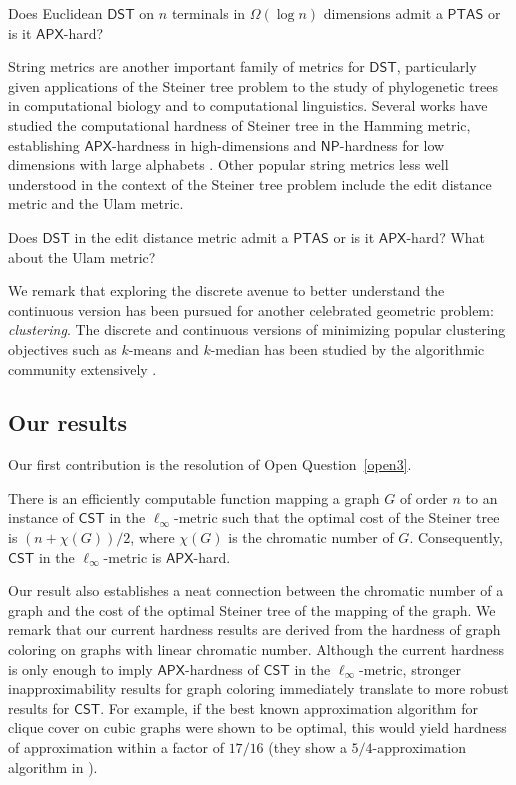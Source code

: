 \documentclass{theoretics}
\newcommand{\1}{\textbf{1}}
\newcommand{\cst}{$\mathsf{CST}$\xspace}
\newcommand{\dst}{$\mathsf{DST}$\xspace}
\newcommand{\np}{$\mathsf{NP}$\xspace}
\newcommand{\apx}{$\mathsf{APX}$\xspace}
\newcommand{\ptas}{$\mathsf{PTAS}$\xspace}
\begin{document}
\begin{openq}\label{open4}
Does Euclidean \dst on $n$ terminals in $\Omega(\log n)$ dimensions admit a \ptas or is it \apx-hard?\end{openq}

String metrics are another important family of metrics for \dst, particularly given applications of the Steiner tree problem to the study of phylogenetic trees in computational biology and to computational linguistics. Several works have studied the computational hardness of Steiner tree in the Hamming metric, establishing \apx-hardness in high-dimensions and \np-hardness for low dimensions with large alphabets \cite{Wareham_1995, althaus2013low, sankoff1975minimal, foulds1982steiner, fernandez1998approximability}.  Other popular string metrics less well understood in the context of the Steiner tree problem include the edit distance metric \cite{lev1966binary} and the Ulam metric.
\begin{openq}\label{open5}
Does \dst in the edit distance metric admit a \ptas or is it \apx-hard? What about the Ulam metric?
\end{openq}

We remark that exploring the discrete avenue to better understand the continuous version has been pursued for another celebrated geometric problem: \emph{clustering}. The discrete and continuous versions of minimizing popular clustering objectives such as $k$-means and $k$-median has been studied by the algorithmic community extensively \cite{byrka2017improved,DBLP:journals/siamcomp/AhmadianNSW20,CNS22,CK19,CKL22}.




\subsection{Our results}\label{sec:results}

Our first contribution is the resolution of Open Question~\ref{open3}. 

\begin{theorem} \label{thm:introellinf}
There is an efficiently computable function mapping a graph $G$ of order $n$ to an instance of \cst in the $\ell_{\infty}$-metric such that the optimal cost of the Steiner tree is $(n + \chi(G))/2$, where $\chi(G)$ is the chromatic number of $G$. Consequently, \cst in the $\ell_{\infty}$-metric is \apx-hard.
\end{theorem}

Our result also establishes a neat connection between the chromatic number of a graph and the cost of the optimal Steiner tree of the mapping of the graph. We remark that our current hardness results are derived from the hardness of graph coloring on graphs with linear chromatic number. Although the current hardness is only enough to imply \apx-hardness of \cst in the $\ell_{\infty}$-metric, stronger inapproximability results for graph coloring immediately translate to more robust results for \cst. For example, if the best known approximation algorithm for clique cover on cubic graphs were shown to be optimal, this would yield hardness of approximation within a factor of $17/16$ (they show a $5/4$-approximation algorithm in \cite{Cerioli_Faria_Ferreira_Martinhon_Protti_Reed_2008}). 
\end{document}
